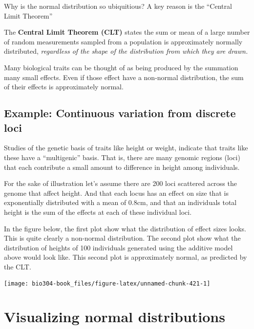 \documentclass[]{book}
\theoremstyle{definition}
\theoremstyle{definition}
\theoremstyle{definition}
\theoremstyle{remark}
\begin{document}
Why is the normal distribution so ubiquitious? A key reason is the
``Central Limit Theorem''

The \textbf{Central Limit Theorem (CLT)} states the sum or mean of a
large number of random measurements sampled from a population is
approximately normally distributed, \emph{regardless of the shape of the
distribution from which they are drawn.}

Many biological traits can be thought of as being produced by the
summation many small effects. Even if those effect have a non-normal
distribution, the sum of their effects is approximately normal.

\hypertarget{example-continuous-variation-from-discrete-loci}{%
\subsection{Example: Continuous variation from discrete
loci}\label{example-continuous-variation-from-discrete-loci}}

Studies of the genetic basis of traits like height or weight, indicate
that traits like these have a ``multigenic'' basis. That is, there are
many genomic regions (loci) that each contribute a small amount to
difference in height among individuals.

For the sake of illustration let's assume there are 200 loci scattered
across the genome that affect height. And that each locus has an effect
on size that is exponentially distributed with a mean of 0.8cm, and that
an individuals total height is the sum of the effects at each of these
individual loci.

In the figure below, the first plot show what the distribution of effect
sizes looks. This is quite clearly a non-normal distribution. The second
plot show what the distribution of heights of 100 individuals generated
using the additive model above would look like. This second plot is
approximately normal, as predicted by the CLT.

\begin{center}\texttt{[image: bio304-book\_files/figure-latex/unnamed-chunk-421-1]} \end{center}

\hypertarget{visualizing-normal-distributions}{%
\section{Visualizing normal
distributions}\label{visualizing-normal-distributions}}
\end{document}
